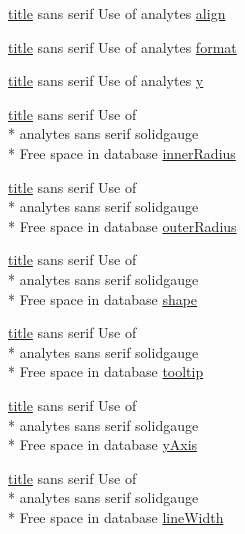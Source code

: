 \begin{DoxyCompactItemize}
\item 
\hyperlink{chart1_8php_a256dc75681c13d8a64135187612ba0ee}{title} sans serif Use of analytes \hyperlink{chart1_8php_a245d529baa23709e9ec659eb954ac212}{align}
\item 
\hyperlink{chart1_8php_a256dc75681c13d8a64135187612ba0ee}{title} sans serif Use of analytes \hyperlink{chart1_8php_a8dc92044d4a2908bbcf6bab430b0fcad}{format}
\item 
\hyperlink{chart1_8php_a256dc75681c13d8a64135187612ba0ee}{title} sans serif Use of analytes \hyperlink{chart1_8php_a4e10c31b21f9f97e6e64112e5987bd13}{y}
\item 
\hyperlink{chart1_8php_a256dc75681c13d8a64135187612ba0ee}{title} sans serif Use of \\*
analytes sans serif solidgauge \\*
Free space in database \hyperlink{chart1_8php_a89f0143e254bf461b321ee5b6b1fa90b}{inner\-Radius}
\item 
\hyperlink{chart1_8php_a256dc75681c13d8a64135187612ba0ee}{title} sans serif Use of \\*
analytes sans serif solidgauge \\*
Free space in database \hyperlink{chart1_8php_a41f34ec2811d09db7935316f9e4a98d6}{outer\-Radius}
\item 
\hyperlink{chart1_8php_a256dc75681c13d8a64135187612ba0ee}{title} sans serif Use of \\*
analytes sans serif solidgauge \\*
Free space in database \hyperlink{chart1_8php_ae7c4d90f4cb1daf8fe98b42979422af5}{shape}
\item 
\hyperlink{chart1_8php_a256dc75681c13d8a64135187612ba0ee}{title} sans serif Use of \\*
analytes sans serif solidgauge \\*
Free space in database \hyperlink{chart1_8php_a2a928e2db41e6fb13386253c6f1d1d3c}{tooltip}
\item 
\hyperlink{chart1_8php_a256dc75681c13d8a64135187612ba0ee}{title} sans serif Use of \\*
analytes sans serif solidgauge \\*
Free space in database \hyperlink{chart1_8php_a904b354726e35f255d93b70b37987c76}{y\-Axis}
\item 
\hyperlink{chart1_8php_a256dc75681c13d8a64135187612ba0ee}{title} sans serif Use of \\*
analytes sans serif solidgauge \\*
Free space in database \hyperlink{chart1_8php_aca8aa21682b9d221fad19341399677d3}{line\-Width}

\end{DoxyCompactItemize}
